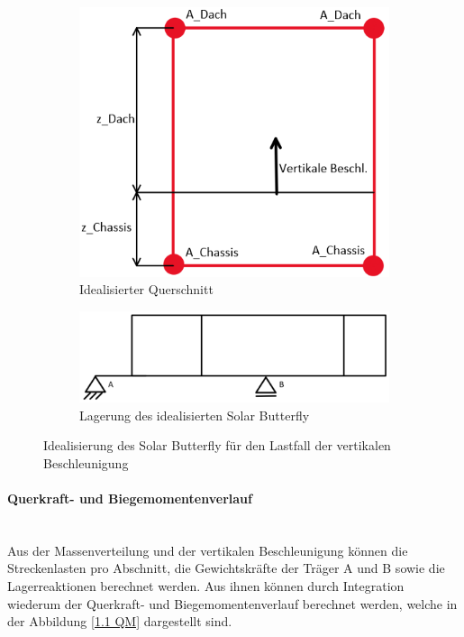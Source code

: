  \begin{figure}[!ht]
    \centering
      \begin{subfigure}{.4\textwidth}
        \centering
        \includegraphics[width=\linewidth]{04_figures/1.1 Querschnitt.png}
        \caption{Idealisierter Querschnitt}
        \label{1.1 Idealisierter Querschnitt}
      \end{subfigure}%
      \begin{subfigure}{.6\textwidth}
        \centering
        \includegraphics[width=\linewidth]{04_figures/1.1 Lagerung.png}
        \caption{Lagerung des idealisierten Solar Butterfly}
        \label{1.1 Lagerung}
      \end{subfigure}%
    \caption{Idealisierung des Solar Butterfly für den Lastfall der vertikalen Beschleunigung}
  \label{1.1 Idealisierung}
  \end{figure}

  \paragraph{Querkraft- und Biegemomentenverlauf}\mbox{}\\
  Aus der Massenverteilung und der vertikalen Beschleunigung können die Streckenlasten pro Abschnitt, die Gewichtskräfte der Träger A und B sowie die Lagerreaktionen berechnet werden. Aus ihnen können durch Integration wiederum der Querkraft- und Biegemomentenverlauf berechnet werden, welche in der Abbildung \ref{1.1 QM} dargestellt sind.

